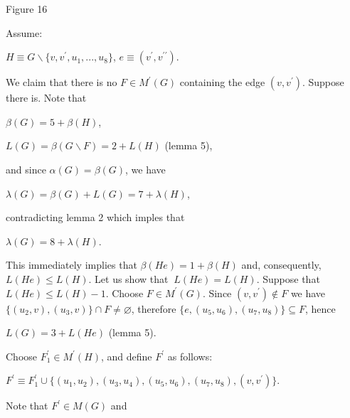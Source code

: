 \documentclass{article}
\begin{document}
\begin{center}

Figure 16\bigskip
\end{center}

Assume:

\begin{center}
$H\equiv G\backslash \{v,v^{\prime },u_{1},...,u_{8}\}$, $e\equiv (v^{\prime
},v^{\prime \prime })$.
\end{center}

We claim that there is no $F\in M^{\prime }(G)$ containing the edge $(v,v^{\prime })$. Suppose there is. Note that

\begin{center}
$\beta (G)=5+\beta (H)$,

$L(G)=\beta (G\backslash F)=2+L(H)$ (lemma 5),
\end{center}

and since $\alpha (G)=\beta (G)$, we have

\begin{center}
$\lambda (G)=\beta (G)+L(G)=7+\lambda (H)$,
\end{center}

contradicting lemma 2 which imples that

\begin{center}
$\lambda (G)=8+\lambda (H)$.
\end{center}

This immediately implies that $\beta (He)=1+\beta (H)$ and, consequently, $L(He)\leq L(H)$. Let us show that $\ L(He)=L(H)$. Suppose that $L(He)\leq
L(H)-1$. Choose $F\in M^{\prime }(G)$. Since $(v,v^{\prime })\notin F$ we
have $\{(u_{2},v),(u_{3},v)\}\cap F\neq \varnothing $, therefore $\{e,(u_{5},u_{6}),(u_{7},u_{8})\}\subseteq F$, hence

\begin{center}
$L(G)=3+L(He)$ (lemma 5).
\end{center}

Choose $F_{1}^{\prime }\in M^{\prime }(H)$, and define $F^{\prime }$ as
follows:

\begin{center}
$F^{\prime }\equiv F_{1}^{\prime }\cup
\{(u_{1},u_{2}),(u_{3},u_{4}),(u_{5},u_{6}),(u_{7},u_{8}),(v,v^{\prime })\}$.
\end{center}

Note that $F^{\prime }\in M(G)$ and
\end{document}
